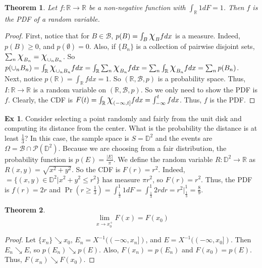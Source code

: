 \documentclass{article}
\newtheorem{theorem}{Theorem}
\theoremstyle{definition}\newtheorem{definition}{DEF}
\theoremstyle{definition}\newtheorem{example}{Ex}
\theoremstyle{lemma}\newtheorem{lemma}{Lemma}
\theoremstyle{corrolary}\newtheorem{corrolary}{Cor}
\begin{document}
\begin{theorem}
Let $f: \mathbb{R} \rightarrow \mathbb{R}$ be a non-negative function with $\int_\mathbb{R} 1 dF=1$.
Then $f$ is the PDF of a random variable.
\end{theorem}
\begin{proof}
First, notice that for $B \in \mathcal{B}$, $p(B)=\int_B \mbox{\Large$\chi$}_B fdx$ is a measure.
Indeed, $p(B) \geq 0$, and $p(\emptyset)=0$.
Also, if $\{B_n\}$ is a collection of pairwise disjoint sets, $\sum_n \mbox{\Large$\chi$}_{B_n} = \mbox{\Large$\chi$}_{\cup_n B_n}$.
So $p(\cup_n B_n)=\int_\mathbb{R} \mbox{\Large$\chi$}_{\cup_n B_n}fdx = \int_\mathbb{R} \sum_n \mbox{\Large$\chi$}_{B_n} fdx = \sum_n \int_\mathbb{R} \mbox{\Large$\chi$}_{B_n}fdx = \sum_n p(B_n)$.\\
Next, notice $p(\mathbb{R})=\int_\mathbb{R} fdx=1$.
So $(\mathbb{R}, \mathcal{B}, p)$ is a probability space.
Thus, $I: \mathbb{R} \rightarrow \mathbb{R}$ is a random variable on $(\mathbb{R}, \mathcal{B}, p)$.
So we only need to show the PDF is $f$.
Clearly, the CDF is $F(t)=\int_\mathbb{R}\mbox{\Large$\chi$}_{(-\infty, t]}fdx= \int_{-\infty}^t fdx$.
Thus, $f$ is the PDF.
\end{proof}

\begin{example}\label{circle_example}
Consider selecting a point randomly and fairly from the unit disk and computing its distance from the center.
What is the probability the distance is at least $\frac{1}{3}$?
In this case, the sample space is $S=\mathbb{D}^2$ and the events are $\Omega=\mathcal{B}\cap\mathcal{P}(\mathbb{D}^2)$.
Because we are choosing from a fair distribution, the probability function is $p(E)=\frac{|E|}{\pi}$.
We define the random variable $R: \mathbb{D}^2 \rightarrow \mathbb{R}$ as $R(x,y)=\sqrt{x^2 + y^2}$.
So the CDF is $F(r)=r^2$.
Indeed, $=\{(x,y)\in \mathbb{D}^2 | x^2 + y^2 \leq r^2 \}$ has measure $\pi r^2$, so $F(r)=r^2$.
Thus, the PDF is $f(r)=2r$ and $\Pr(r\geq \frac{1}{3}) = \int_\frac{1}{3}^1 1dF=\int_\frac{1}{3}^1 2r dr = r^2 |_\frac{1}{3}^1 = \frac{8}{9}$.
\end{example}

\begin{theorem}
\begin{equation}
\lim_{x\to x_0^+} F(x) = F(x_0)
\end{equation}
\end{theorem}
\begin{proof}
Let $\{x_n \} \searrow x_0$, $E_n=X^{-1}((-\infty, x_n])$, and $E=X^{-1}((-\infty, x_0])$.
Then $E_n \searrow E$, so $p(E_n) \searrow p(E)$.
Also, $F(x_n)=p(E_n)$ and $F(x_0)=p(E)$.
Thus, $F(x_n)\searrow F(x_0)$.
\end{proof}
\end{document}
